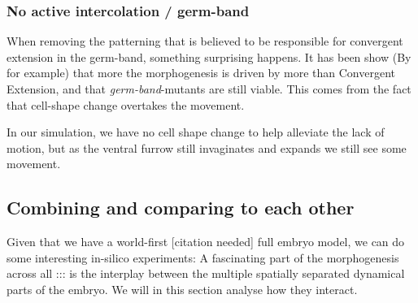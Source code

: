 


\subsubsection{No active intercolation / germ-band}
\label{sec:mutantNoGB}

When removing the patterning that is believed to be responsible for convergent extension in the germ-band, something surprising happens. It has been show (By  for example) that more the morphogenesis is driven by more than Convergent Extension, and that \textit{germ-band}-mutants are still viable. This comes from the fact that cell-shape change overtakes the movement.

In our simulation, we have no cell shape change to help alleviate the lack of motion, but as the ventral furrow still invaginates and expands we still see some movement. 






\subsection{Combining and comparing to each other}
Given that we have a world-first [citation needed] full embryo model, we can do some interesting in-silico experiments: A fascinating part of the morphogenesis across all ::: is the interplay between the multiple spatially separated dynamical parts of the embryo. We will in this section analyse how they interact. 

